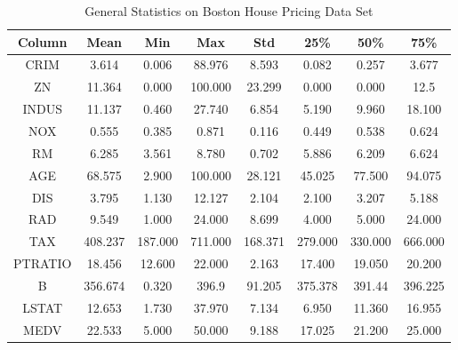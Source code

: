 \begin{table}[H]
    \centering
    \begin{tabular}{c|c|c|c|c|c|c|c}
          \hline
         Column & Mean & Min & Max & Std & 25\% & 50\% & 75\%  \\
        \hline
         CRIM & 3.614 & 0.006 & 88.976 & 8.593 & 0.082 & 0.257 & 3.677\\
         ZN & 11.364 & 0.000 & 100.000 & 23.299 & 0.000 & 0.000 & 12.5\\
         INDUS & 11.137 & 0.460 & 27.740 & 6.854 & 5.190 & 9.960 & 18.100\\
         NOX & 0.555 & 0.385 & 0.871 & 0.116 & 0.449 & 0.538 & 0.624\\
         RM & 6.285 & 3.561 & 8.780 & 0.702 & 5.886 & 6.209 & 6.624\\
         AGE & 68.575 & 2.900 & 100.000 & 28.121 & 45.025 & 77.500 & 94.075\\
         DIS & 3.795 & 1.130 & 12.127 & 2.104 & 2.100 & 3.207 & 5.188\\
         RAD & 9.549 & 1.000 & 24.000 & 8.699 & 4.000 & 5.000 & 24.000\\
         TAX & 408.237 & 187.000 & 711.000 & 168.371 & 279.000 & 330.000 & 666.000\\
         PTRATIO & 18.456 & 12.600 & 22.000 & 2.163 & 17.400 & 19.050 & 20.200\\
         B & 356.674 & 0.320 & 396.9 & 91.205 & 375.378 & 391.44 & 396.225\\
         LSTAT & 12.653 & 1.730 & 37.970 & 7.134 & 6.950 & 11.360 & 16.955\\
         MEDV & 22.533 & 5.000 & 50.000 & 9.188 & 17.025 & 21.200 & 25.000\\
    \end{tabular}
    \caption{General Statistics on Boston House Pricing Data Set}
    \label{tab:housing_table}
\end{table}